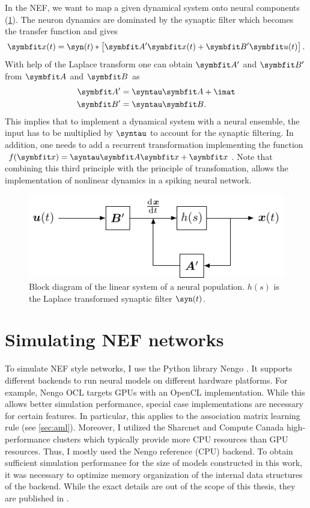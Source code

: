 In the NEF, we want to map a given dynamical system onto neural components (\cref{fig:neural-lti}).
The neuron dynamics are dominated by the synaptic filter \parencite[Appendix~F.1]{eliasmith2003} which becomes the transfer function and gives
\begin{equation}
    \vc x(t) = \syn(t) * \sbr{\mat A' \vc x(t) + \mat B' \vc u(t)} \text{.}
\end{equation}
With help of the Laplace transform one can obtain $\mat A'$ and $\mat B'$ from $\mat A$ and $\mat B$ as
\begin{align}
    \mat A' &= \syntau \mat A + \imat \\
    \mat B' &= \syntau \mat B  \text{.}
\end{align}
This implies that to implement a dynamical system with a neural ensemble, the input has to be multiplied by $\syntau$ to account for the synaptic filtering.
In addition, one needs to add a recurrent transformation implementing the function $f(\vc x) = \syntau \mat A \vc x + \vc x$.
Note that combining this third principle with the principle of transfomation, allows the implementation of nonlinear dynamics in a spiking neural network.
\begin{figure}
    \centering
    \includegraphics{tikz/neural-lti}
    \caption[Block diagram of the linear system of a neural population.]{Block diagram of the linear system of a neural population. $h(s)$ is the Laplace transformed synaptic filter $\syn(t)$.}\label{fig:neural-lti}
\end{figure}


\section{Simulating NEF networks}
To simulate NEF style networks, I use the Python library Nengo \parencite{bekolay2014,sharma2016}.
It supports different backends to run neural models on different hardware platforms.
For example, Nengo OCL targets GPUs with an OpenCL implementation.
While this allows better simulation performance, special case implementations are necessary for certain features.
In particular, this applies to the association matrix learning rule (see \cref{sec:aml}).
Moreover, I utilized the Sharcnet and Compute Canada high-performance clusters which typically provide more CPU resources than GPU resources.
Thus, I mostly used the Nengo reference (CPU) backend.
To obtain sufficient simulation performance for the size of models constructed in this work, it was necessary to optimize memory organization of the internal data structures of the backend.
While the exact details are out of the scope of this thesis, they are published in \textcite{gosmann2017}.
